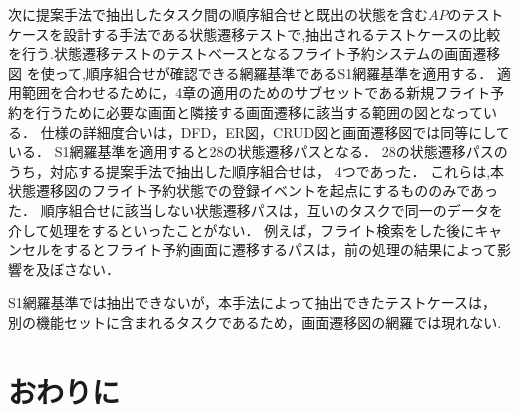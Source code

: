 \documentclass[a4paper,12pt]{jreport}
\begin{document}
次に提案手法で抽出したタスク間の順序組合せと既出の状態を含む$AP$のテストケースを設計する手法である状態遷移テストで,抽出されるテストケースの比較を行う.状態遷移テストのテストベースとなるフライト予約システムの画面遷移図
を使って,順序組合せが確認できる網羅基準であるS1網羅基準を適用する．
適用範囲を合わせるために，4章の適用のためのサブセットである新規フライト予約を行うために必要な画面と隣接する画面遷移に該当する範囲の図となっている．
仕様の詳細度合いは，DFD，ER図，CRUD図と画面遷移図では同等にしている．
S1網羅基準を適用すると28の状態遷移パスとなる．
28の状態遷移パスのうち，対応する提案手法で抽出した順序組合せは，
4つであった．
これらは,本状態遷移図のフライト予約状態での登録イベントを起点にするもののみであった．
順序組合せに該当しない状態遷移パスは，互いのタスクで同一のデータを介して処理をするといったことがない．
例えば，フライト検索をした後にキャンセルをするとフライト予約画面に遷移するパスは，前の処理の結果によって影響を及ぼさない．

S1網羅基準では抽出できないが，本手法によって抽出できたテストケースは，
別の機能セットに含まれるタスクであるため，画面遷移図の網羅では現れない.

\section{おわりに}
\end{document}
